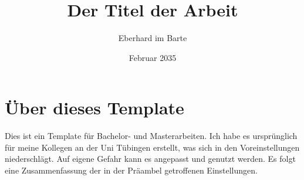

\title{Der Titel der Arbeit}
\author{Eberhard im Barte}
\date{Februar 2035}

%




\makedocumentstart

\chapter{Über dieses Template}
Dies ist ein Template für Bachelor- und Masterarbeiten.
Ich habe es ursprünglich für meine Kollegen an der Uni Tübingen erstellt, was sich in den Voreinstellungen niederschlägt.
Auf eigene Gefahr kann es angepasst und genutzt werden.
Es folgt eine Zusammenfassung der in der Präambel getroffenen Einstellungen.

\let\pkg\textsf

